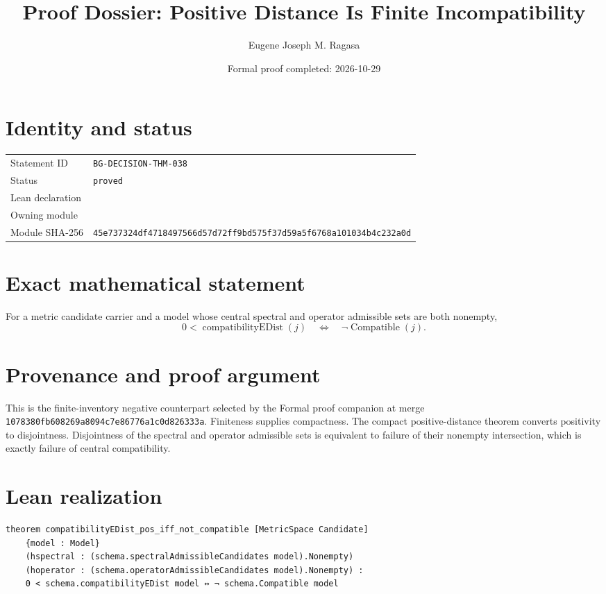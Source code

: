 \documentclass[11pt]{article}
\title{Proof Dossier: Positive Distance Is Finite Incompatibility}
\author{Eugene Joseph M. Ragasa}
\date{Formal proof completed: 2026-10-29}
\begin{document}
\maketitle
\section{Identity and status}
\begin{tabularx}{\textwidth}{@{}lY@{}}\toprule
Statement ID & \texttt{BG-DECISION-THM-038} \\
Status & \texttt{proved} \\
Lean declaration &  \\
Owning module &  \\
Module SHA-256 & \texttt{45e737324df4718497566d57d72ff9bd575f37d59a5f6768a101034b4c232a0d} \\
\bottomrule\end{tabularx}
\section{Exact mathematical statement}
For a metric candidate carrier and a model whose central spectral and operator admissible
sets are both nonempty,
\[
  0<\operatorname{compatibilityEDist}(j)
  \quad\Longleftrightarrow\quad
  \neg\operatorname{Compatible}(j).
\]
\section{Provenance and proof argument}
This is the finite-inventory negative counterpart selected by the Formal proof companion
at merge \texttt{1078380fb608269a8094c7e86776a1c0d826333a}. Finiteness supplies compactness.
The compact positive-distance theorem converts positivity to disjointness. Disjointness
of the spectral and operator admissible sets is equivalent to failure of their nonempty
intersection, which is exactly failure of central compatibility.
\section{Lean realization}
\begin{lstlisting}
theorem compatibilityEDist_pos_iff_not_compatible [MetricSpace Candidate]
    {model : Model}
    (hspectral : (schema.spectralAdmissibleCandidates model).Nonempty)
    (hoperator : (schema.operatorAdmissibleCandidates model).Nonempty) :
    0 < schema.compatibilityEDist model ↔ ¬ schema.Compatible model
\end{lstlisting}
\end{document}
